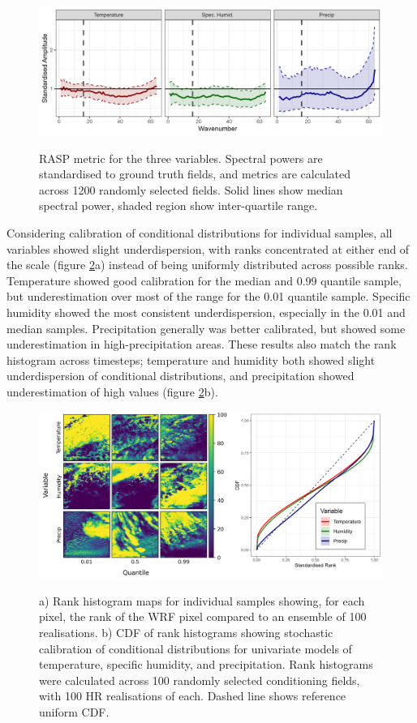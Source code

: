 \documentclass{ametsocV6.1}
\begin{document}
\begin{figure}[H]
  \noindent\includegraphics[width=\textwidth,angle=0]{final/RASP_loc1.png}\\
  \caption{RASP metric for the three variables. Spectral powers are standardised to ground truth fields, and metrics are calculated across 1200 randomly selected fields. Solid lines show median spectral power, shaded region show inter-quartile range.}\label{rasp1}
\end{figure}

Considering calibration of conditional distributions for individual samples, all variables showed slight underdispersion, with ranks concentrated at either end of the scale (figure \ref{rankhist1}a) instead of being uniformly distributed across possible ranks. Temperature showed good calibration for the median and 0.99 quantile sample, but underestimation over most of the range for the 0.01 quantile sample. Specific humidity showed the most consistent underdispersion, especially in the 0.01 and median samples. Precipitation generally was better calibrated, but showed some underestimation in high-precipitation areas. These results also match the rank histogram across timesteps; temperature and humidity both showed slight underdispersion of conditional distributions, and precipitation showed underestimation of high values (figure \ref{rankhist1}b).  
\begin{figure}[H]
  \noindent\includegraphics[width=\textwidth,angle=0]{final/Loc1_RankHist.png}\\
  \caption{a) Rank histogram maps for individual samples showing, for each pixel, the rank of the WRF pixel compared to an ensemble of 100 realisations. b) CDF of rank histograms showing stochastic calibration of conditional distributions for univariate models of temperature, specific humidity, and precipitation. Rank histograms were calculated across 100 randomly selected conditioning fields, with 100 HR realisations of each. Dashed line shows reference uniform CDF.}\label{rankhist1}
\end{figure}
\end{document}

